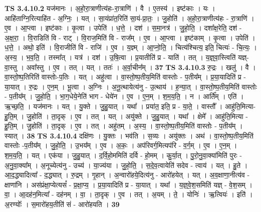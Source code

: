 \documentclass[17pt]{extarticle}
\begin{document}
                  \newline
                                \textbf{ TS 3.4.10.2} \newline
                  यज॑मानः । अ॒हो॒रा॒त्राणीत्य॑हः-रा॒त्राणि॑ । वै । ए॒तस्य॑ । इष्ट॑काः । यः । आहि॑ताग्नि॒रित्याहि॑त - अ॒ग्निः॒ । यत् । सा॒यंप्रा॑त॒रिति॑ सा॒यं-प्रा॒तः॒ । जु॒होति॑ । अ॒हो॒रा॒त्राणीत्य॑हः - रा॒त्राणि॑ । ए॒व । आ॒प्त्वा । इष्ट॑काः । कृ॒त्वा । उपेति॑ । ध॒त्ते॒ । दश॑ । स॒मा॒नत्र॑ । जु॒हो॒ति॒ । दशा᳚क्ष॒रेति॒ दश॑ - अ॒क्ष॒रा॒ । वि॒राडिति॑ वि - राट् । वि॒राज॒मिति॑ वि - राज᳚म् । ए॒व । आ॒प्त्वा । इष्ट॑काम् । कृ॒त्वा । उपेति॑ । ध॒त्ते॒ । अथो॒ इति॑ । वि॒राजीति॑ वि - राजि॑ । ए॒व । य॒ज्ञ्म् । आ॒प्नो॒ति॒ । चित्य॑श्चित्य॒ इति॒ चित्यः॑ - चि॒त्यः॒ । अ॒स्य॒ । भ॒व॒ति॒ । तस्मा᳚त् । यत्र॑ । दश॑ । उ॒षि॒त्वा । प्र॒यातीति॑ प्र - याति॑ । तत् । य॒ज्ञ्॒वा॒स्त्विति॑ यज्ञ्-वा॒स्तु । अवा᳚स्तु । ए॒व । तत् । यत् । ततः॑ । अ॒र्वा॒चीन᳚म् । \textbf{  37} \newline
                  \newline
                                \textbf{ TS 3.4.10.3} \newline
                  रु॒द्रः । खलु॑ । वै । वा॒स्तो॒ष्प॒तिरिति॑ वास्तोः-प॒तिः । यत् । अहु॑त्वा । वा॒स्तो॒ष्प॒तीय॒मिति॑ वास्तोः - प॒तीय᳚म् । प्र॒या॒यादिति॑ प्र - या॒यात् । रु॒द्रः । ए॒न॒म् । भू॒त्वा । अ॒ग्निः । अ॒नू॒त्थायेत्य॑नु - उ॒त्थाय॑ । ह॒न्या॒त् । वा॒स्तो॒ष्प॒तीय॒मिति॑ वास्तोः - प॒तीय᳚म् । जु॒हो॒ति॒ । भा॒ग॒धेये॒नेति॑ भाग - धेये॑न । ए॒व । ए॒न॒म् । श॒म॒य॒ति॒ । न । आर्ति᳚म् । एति॑ । ऋ॒च्छ॒ति॒ । यज॑मानः । यत् । यु॒क्ते । जु॒हु॒यात् । यथा᳚ । प्रया॑त॒ इति॒ प्र - या॒ते॒ । वास्तौ᳚ । आहु॑ति॒मित्या-हु॒ति॒म् । जु॒होति॑ । ता॒दृक् । ए॒व । तत् । यत् । अयु॑क्ते । जु॒हु॒यात् । यथा᳚ । क्षेमे᳚ । आहु॑ति॒मित्या - हु॒ति॒म् । जु॒होति॑ । ता॒दृक् । ए॒व । तत् । अहु॑तम् । अ॒स्य॒ । वा॒स्तो॒ष्प॒तीय॒मिति॑ वास्तोः - प॒तीय᳚म् । स्यात् । \textbf{  38} \newline
                  \newline
                                \textbf{ TS 3.4.10.4} \newline
                  दक्षि॑णः । यु॒क्तः । भव॑ति । स॒व्यः । अयु॑क्तः । अथ॑ । वा॒स्तो॒ष्प॒तीय॒मिति॑ वास्तोः -प॒तीय᳚म् । जु॒हो॒ति॒ । उ॒भय᳚म् । ए॒व । अ॒कः॒ । अप॑रिवर्ग॒मित्यप॑रि - व॒र्ग॒म् । ए॒व । ए॒न॒म् । श॒म॒य॒ति॒ । यत् । एक॑या । जु॒हु॒यात् । द॒र्वि॒हो॒ममिति॑ दर्वि - हो॒मम् । कु॒र्या॒त् । पु॒रो॒नु॒वा॒क्या॑मिति॑ पुरः - अ॒नु॒वा॒क्या᳚म् । अ॒नूच्येत्य॑नु - उच्य॑ । या॒ज्य॑या । जु॒हो॒ति॒ । स॒दे॒व॒त्वायेति॑ सदेव - त्वाय॑ । यत् । हु॒ते । आ॒द॒द्ध्यादित्या᳚ - द॒द्ध्यात् । रु॒द्रम् । गृ॒हान् । अ॒न्वारो॑हये॒दित्य॑नु - आरो॑हयेत् । यत् । अ॒व॒क्षाणा॒नीत्य॑व - क्षाणा॑नि । अस॑प्रंक्षा॒प्येत्यसं᳚ - प्र॒क्षा॒प्य॒ । प्र॒या॒यादिति॑ प्र - या॒यात् । यथा᳚ । य॒ज्ञ्॒वे॒श॒समिति॑ यज्ञ् - वे॒श॒सम् । वा॒ । आ॒दह॑न॒मित्या᳚ - दह॑नम् । वा॒ । ता॒दृक् । ए॒व । तत् । अ॒यम् । ते॒ । योनिः॑ । ऋ॒त्वियः॑ । इति॑ । अ॒रण्योः᳚ । स॒मारो॑हय॒तीति॑ सं - आरो॑हयति । \textbf{  39} \newline
\end{document}
